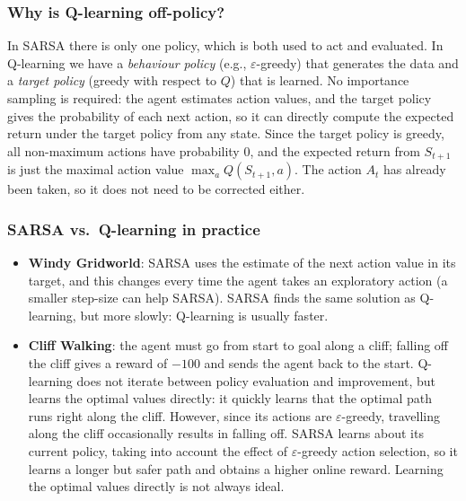 \subsubsection{Why is Q-learning off-policy?}
In SARSA there is only one policy, which is both used to act and evaluated. In Q-learning we have a \emph{behaviour policy} (e.g., $\varepsilon$-greedy) that generates the data and a \emph{target policy} (greedy with respect to $Q$) that is learned. No importance sampling is required: the agent estimates action values, and the target policy gives the probability of each next action, so it can directly compute the expected return under the target policy from any state. Since the target policy is greedy, all non-maximum actions have probability 0, and the expected return from $S_{t+1}$ is just the maximal action value $\max_a Q(S_{t+1},a)$. The action $A_t$ has already been taken, so it does not need to be corrected either.

\subsubsection{SARSA vs.\ Q-learning in practice}
\begin{itemize}
    \item \textbf{Windy Gridworld}: SARSA uses the estimate of the next action value in its target, and this changes every time the agent takes an exploratory action (a smaller step-size can help SARSA). SARSA finds the same solution as Q-learning, but more slowly: Q-learning is usually faster.
    \item \textbf{Cliff Walking}: the agent must go from start to goal along a cliff; falling off the cliff gives a reward of $-100$ and sends the agent back to the start. Q-learning does not iterate between policy evaluation and improvement, but learns the optimal values directly: it quickly learns that the optimal path runs right along the cliff. However, since its actions are $\varepsilon$-greedy, travelling along the cliff occasionally results in falling off. SARSA learns about its current policy, taking into account the effect of $\varepsilon$-greedy action selection, so it learns a longer but safer path and obtains a higher online reward. Learning the optimal values directly is not always ideal.
\end{itemize}

